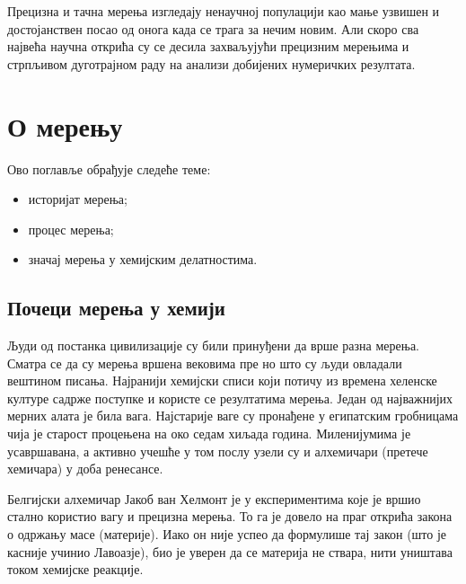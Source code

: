\begin{savequote}
	Прецизна и тачна мерења изгледају ненаучној популацији
	као мање узвишен и достојанствен посао од онога када
	се трага за нечим новим. Али скоро сва највећа научна
	открића су се десила захваљујући прецизним мерењима и
	стрпљивом дуготрајном раду на анализи добијених нумеричких
	резултата.
\end{savequote}
\chapter{О мерењу}

\begin{sazetak}
  Ово поглавље обрађује следеће теме:\\[2mm]
  \begin{itemize}
  \item историјат мерења;
  \item процес мерења;
  \item значај мерења у хемијским делатностима.
  \end{itemize}
\end{sazetak}

\section{Почеци мерења у хемији}

Људи од постанка цивилизације су били принуђени да врше разна мерења.
Сматра се да су мерења вршена вековима пре но што су људи овладали
вештином писања. Најранији хемијски списи који потичу из времена
хеленске културе садрже поступке и користе се резултатима мерења.
Један од најважнијих мерних алата је била вага. Најстарије ваге су
пронађене у египатским гробницама чија је старост процењена на
око седам хиљада година. Миленијумима је усавршавана, а активно
учешће у том послу узели су и алхемичари (претече хемичара) у доба
ренесансе.

Белгијски алхемичар Јакоб ван Хелмонт је у експериментима које је
вршио стално користио вагу и прецизна мерења. То га је довело на
праг открића закона о одржању масе (материје). Иако он није успео
да формулише тај закон (што је касније учинио Лавоазје), био је
уверен да се материја не ствара, нити уништава током хемијске
реакције.

